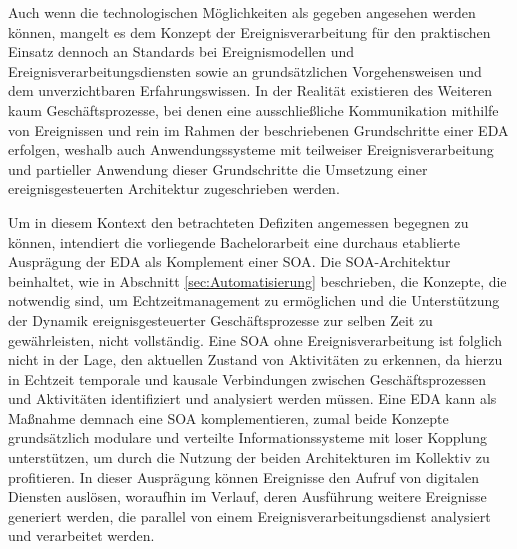 Auch wenn die technologischen Möglichkeiten als gegeben angesehen werden können, mangelt es dem Konzept der Ereignisverarbeitung für den praktischen Einsatz dennoch an Standards bei Ereignismodellen und Ereignisverarbeitungsdiensten sowie an grundsätzlichen Vorgehensweisen und dem unverzichtbaren Erfahrungswissen. 
\cite{Etzion.2011}
In der Realität existieren des Weiteren kaum Geschäftsprozesse, bei denen eine ausschließliche Kommunikation mithilfe von Ereignissen und rein im Rahmen der beschriebenen Grundschritte einer \ac{EDA} erfolgen, weshalb auch Anwendungssysteme mit teilweiser Ereignisverarbeitung und partieller Anwendung dieser Grundschritte die Umsetzung einer ereignisgesteuerten Architektur zugeschrieben werden.
\cite{Etzion.2011}


Um in diesem Kontext den betrachteten Defiziten angemessen begegnen zu können, intendiert die vorliegende Bachelorarbeit eine durchaus etablierte Ausprägung der \ac{EDA} als Komplement einer \ac{SOA}.
Die \ac{SOA}-Architektur beinhaltet, wie in Abschnitt \ref{sec:Automatisierung} beschrieben, die Konzepte, die notwendig sind, um Echtzeitmanagement zu ermöglichen und die Unterstützung der Dynamik ereignisgesteuerter Geschäftsprozesse zur selben Zeit zu gewährleisten, nicht vollständig.
Eine \ac{SOA} ohne Ereignisverarbeitung ist folglich nicht in der Lage, den aktuellen Zustand von Aktivitäten zu erkennen, da hierzu in Echtzeit temporale und kausale Verbindungen zwischen Geschäftsprozessen und Aktivitäten identifiziert und analysiert werden müssen. 
Eine \ac{EDA} kann als Maßnahme demnach eine \ac{SOA} komplementieren, zumal beide Konzepte grundsätzlich modulare und verteilte Informationssysteme mit loser Kopplung unterstützen, um durch die Nutzung der beiden Architekturen im Kollektiv zu profitieren. 
\cite{Bruns.2010}
In dieser Ausprägung können Ereignisse den Aufruf von digitalen Diensten auslösen, woraufhin im Verlauf, deren Ausführung weitere Ereignisse generiert werden, die parallel von einem Ereignisverarbeitungsdienst analysiert und verarbeitet werden. 
\cite{Bruns.2010}
